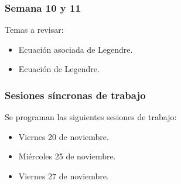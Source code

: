 \begin{frame}
\frametitle{Semana 10 y 11}
Temas a revisar:
\begin{itemize}
\item Ecuación asociada de Legendre.
\item Ecuación de Legendre.
\end{itemize}
\end{frame}
\begin{frame}
\frametitle{Sesiones síncronas de trabajo}
Se programan las siguientes sesiones de trabajo:
\begin{itemize}
\item Viernes 20 de noviembre.
\item Miércoles 25 de noviembre.
\item Viernes 27 de noviembre.
\end{itemize}
\end{frame}
